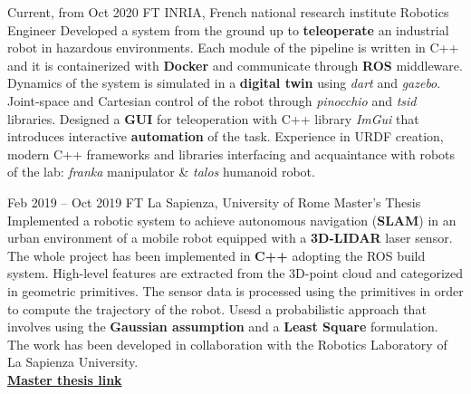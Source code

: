 \documentclass[
	10pt, %
]{FreemanCV}
\begin{document}
\begin{paracol}{2}


\jobentry
	{Current, from Oct 2020} %
	{FT} %
        {INRIA, French national research institute} %
	{Robotics Engineer} %
	{
          Developed a system from the ground up to \textbf{teleoperate} an industrial robot in hazardous environments.
          Each module of the pipeline is written in C++ and it is containerized with \textbf{Docker} and communicate through \textbf{ROS} middleware.
          Dynamics of the system is simulated in a \textbf{digital twin} using \textit{dart} and \textit{gazebo}.
          Joint-space and Cartesian control of the robot through \textit{pinocchio} and \textit{tsid} libraries.
          Designed a \textbf{GUI} for teleoperation with C++ library \textit{ImGui} that introduces interactive \textbf{automation} of the task.
          Experience in URDF creation, modern C++ frameworks and libraries interfacing and
          acquaintance with robots of the lab: \textit{franka}  manipulator \& \textit{talos} humanoid robot.
        }

\jobentry
	{Feb 2019 -- Oct 2019} %
	{FT} %
	{La Sapienza, University of Rome} %
	{Master's Thesis} %
        {Implemented a robotic system to achieve autonomous navigation (\textbf{SLAM}) in an urban environment of a mobile robot equipped with a \textbf{3D-LIDAR} laser sensor.
         The whole project has been implemented in \textbf{C++} adopting the ROS build system.
         High-level features are extracted from the 3D-point cloud and categorized in geometric primitives.
         The sensor data is processed using the primitives in order to compute the trajectory of the robot.
         Usesd a probabilistic approach that involves using the \textbf{Gaussian assumption} and a \textbf{Least Square} formulation.
         The work has been developed in collaboration with the Robotics Laboratory of La Sapienza University.\\
         \href{https://github.com/dinies/MasterThesis-ArtificialIntelligence-Robotics/blob/master/MaterThesis_Edoardo_Ghini.pdf}{\textbf{Master thesis link}}
         }

         

\end{paracol}
\end{document}
